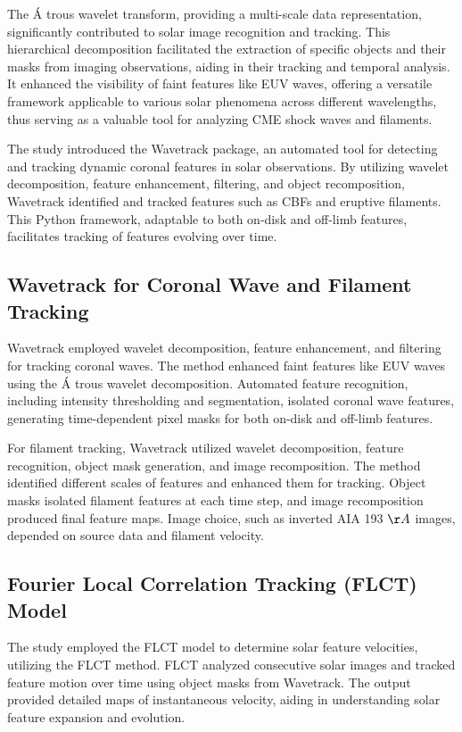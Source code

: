 The \'A trous wavelet transform, providing a multi-scale data representation, significantly contributed to solar image recognition and tracking. This hierarchical decomposition facilitated the extraction of specific objects and their masks from imaging observations, aiding in their tracking and temporal analysis. It enhanced the visibility of faint features like EUV waves, offering a versatile framework applicable to various solar phenomena across different wavelengths, thus serving as a valuable tool for analyzing CME shock waves and filaments.

The study introduced the Wavetrack package, an automated tool for detecting and tracking dynamic coronal features in solar observations. By utilizing wavelet decomposition, feature enhancement, filtering, and object recomposition, Wavetrack identified and tracked features such as CBFs and eruptive filaments. This Python framework, adaptable to both on-disk and off-limb features, facilitates tracking of features evolving over time.

\subsection{Wavetrack for Coronal Wave and Filament Tracking}
Wavetrack employed wavelet decomposition, feature enhancement, and filtering for tracking coronal waves. The method enhanced faint features like EUV waves using the \'A trous wavelet decomposition. Automated feature recognition, including intensity thresholding and segmentation, isolated coronal wave features, generating time-dependent pixel masks for both on-disk and off-limb features.

For filament tracking, Wavetrack utilized wavelet decomposition, feature recognition, object mask generation, and image recomposition. The method identified different scales of features and enhanced them for tracking. Object masks isolated filament features at each time step, and image recomposition produced final feature maps. Image choice, such as inverted AIA 193 $\AA$ images, depended on source data and filament velocity.

\subsection{Fourier Local Correlation Tracking (FLCT) Model}
The study employed the FLCT model to determine solar feature velocities, utilizing the FLCT method. FLCT analyzed consecutive solar images and tracked feature motion over time using object masks from Wavetrack. The output provided detailed maps of instantaneous velocity, aiding in understanding solar feature expansion and evolution.

